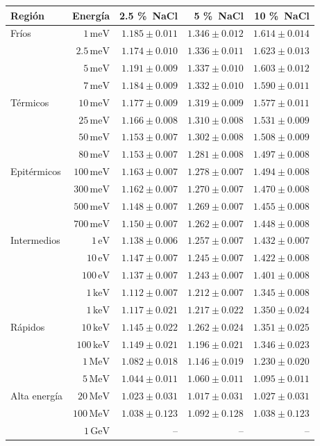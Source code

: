 \begin{tabular}{lrrrr}
\toprule
Región & Energía & 2.5 \%~NaCl & 5 \%~NaCl & 10 \%~NaCl \\
\midrule
Fríos & $1\,\mathrm{meV}$ & $1.185\pm0.011$ & $1.346\pm0.012$ & $1.614\pm0.014$ \\
 & $2.5\,\mathrm{meV}$ & $1.174\pm0.010$ & $1.336\pm0.011$ & $1.623\pm0.013$ \\
 & $5\,\mathrm{meV}$ & $1.191\pm0.009$ & $1.337\pm0.010$ & $1.603\pm0.012$ \\
 & $7\,\mathrm{meV}$ & $1.184\pm0.009$ & $1.332\pm0.010$ & $1.590\pm0.011$ \\
\midrule
Térmicos & $10\,\mathrm{meV}$ & $1.177\pm0.009$ & $1.319\pm0.009$ & $1.577\pm0.011$ \\
 & $25\,\mathrm{meV}$ & $1.166\pm0.008$ & $1.310\pm0.008$ & $1.531\pm0.009$ \\
 & $50\,\mathrm{meV}$ & $1.153\pm0.007$ & $1.302\pm0.008$ & $1.508\pm0.009$ \\
 & $80\,\mathrm{meV}$ & $1.153\pm0.007$ & $1.281\pm0.008$ & $1.497\pm0.008$ \\
\midrule
Epitérmicos & $100\,\mathrm{meV}$ & $1.163\pm0.007$ & $1.278\pm0.007$ & $1.494\pm0.008$ \\
 & $300\,\mathrm{meV}$ & $1.162\pm0.007$ & $1.270\pm0.007$ & $1.470\pm0.008$ \\
 & $500\,\mathrm{meV}$ & $1.148\pm0.007$ & $1.269\pm0.007$ & $1.455\pm0.008$ \\
 & $700\,\mathrm{meV}$ & $1.150\pm0.007$ & $1.262\pm0.007$ & $1.448\pm0.008$ \\
\midrule
Intermedios & $1\,\mathrm{eV}$ & $1.138\pm0.006$ & $1.257\pm0.007$ & $1.432\pm0.007$ \\
 & $10\,\mathrm{eV}$ & $1.147\pm0.007$ & $1.245\pm0.007$ & $1.422\pm0.008$ \\
 & $100\,\mathrm{eV}$ & $1.137\pm0.007$ & $1.243\pm0.007$ & $1.401\pm0.008$ \\
 & $1\,\mathrm{keV}$ & $1.112\pm0.007$ & $1.212\pm0.007$ & $1.345\pm0.008$ \\
\midrule
 & $1\,\mathrm{keV}$ & $1.117\pm0.021$ & $1.217\pm0.022$ & $1.350\pm0.024$ \\
\midrule
Rápidos & $10\,\mathrm{keV}$ & $1.145\pm0.022$ & $1.262\pm0.024$ & $1.351\pm0.025$ \\
 & $100\,\mathrm{keV}$ & $1.149\pm0.021$ & $1.196\pm0.021$ & $1.346\pm0.023$ \\
 & $1\,\mathrm{MeV}$ & $1.082\pm0.018$ & $1.146\pm0.019$ & $1.230\pm0.020$ \\
 & $5\,\mathrm{MeV}$ & $1.044\pm0.011$ & $1.060\pm0.011$ & $1.095\pm0.011$ \\
\midrule
Alta energía & $20\,\mathrm{MeV}$ & $1.023\pm0.031$ & $1.017\pm0.031$ & $1.027\pm0.031$ \\
 & $100\,\mathrm{MeV}$ & $1.038\pm0.123$ & $1.092\pm0.128$ & $1.038\pm0.123$ \\
 & $1\,\mathrm{GeV}$ & -- & -- & -- \\
\bottomrule
\end{tabular}
